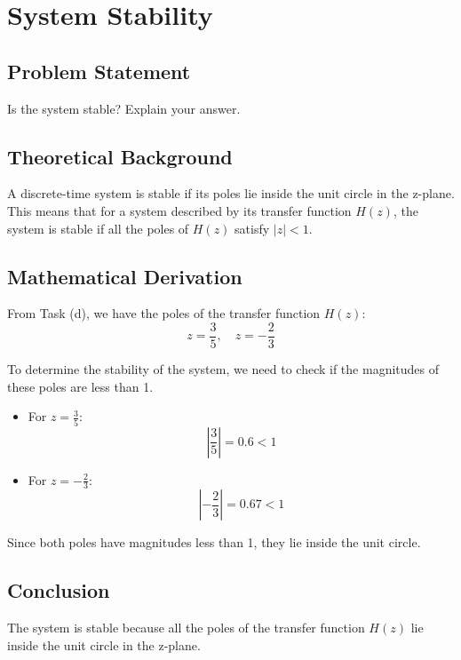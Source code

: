 \item[(e)]
\section{System Stability}

\subsection*{Problem Statement}
Is the system stable? Explain your answer.

\subsection*{Theoretical Background}
A discrete-time system is stable if its poles lie inside the unit circle in the z-plane. This means that for a system described by its transfer function \( H(z) \), the system is stable if all the poles of \( H(z) \) satisfy \( |z| < 1 \).

\subsection*{Mathematical Derivation}
From Task (d), we have the poles of the transfer function \( H(z) \):
\[ z = \frac{3}{5}, \quad z = -\frac{2}{3} \]

To determine the stability of the system, we need to check if the magnitudes of these poles are less than 1.

\begin{itemize}
    \item For \( z = \frac{3}{5} \):
    \[ \left| \frac{3}{5} \right| = 0.6 < 1 \]
    \item For \( z = -\frac{2}{3} \):
    \[ \left| -\frac{2}{3} \right| = 0.67 < 1 \]
\end{itemize}

Since both poles have magnitudes less than 1, they lie inside the unit circle.

\subsection*{Conclusion}
The system is stable because all the poles of the transfer function \( H(z) \) lie inside the unit circle in the z-plane.
